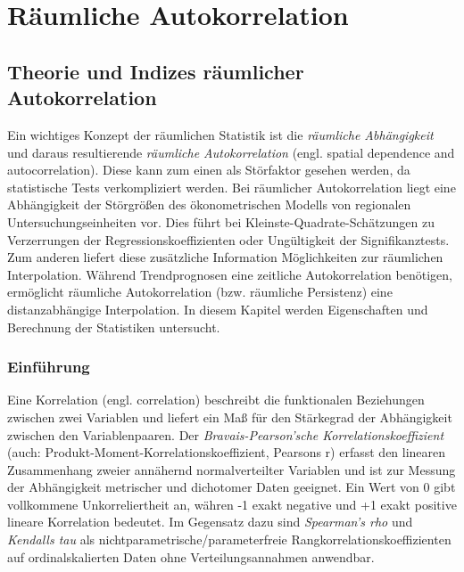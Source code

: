 \chapter{Räumliche Autokorrelation}
\label{ch:autocorrelation}
\section{Theorie und Indizes räumlicher Autokorrelation}

Ein wichtiges Konzept der räumlichen Statistik ist die \emph{räumliche Abhängigkeit} und daraus 
resultierende \emph{räumliche Autokorrelation} (engl. spatial dependence and autocorrelation).
Diese kann zum einen als Störfaktor gesehen werden, da statistische Tests verkompliziert werden. 
Bei räumlicher Autokorrelation liegt eine Abhängigkeit der Störgrößen des ökonometrischen Modells von regionalen 
Untersuchungseinheiten vor. Dies führt bei Kleinste-Quadrate-Schätzungen zu Verzerrungen der Regressionskoeffizienten 
oder Ungültigkeit der Signifikanztests. Zum anderen liefert diese zusätzliche Information Möglichkeiten 
zur räumlichen Interpolation. Während Trendprognosen eine zeitliche Autokorrelation benötigen, 
ermöglicht räumliche Autokorrelation (bzw. räumliche Persistenz) eine distanzabhängige Interpolation. 
In diesem Kapitel werden Eigenschaften und Berechnung der Statistiken untersucht.

\subsection{Einführung}

Eine Korrelation (engl. correlation) beschreibt die funktionalen Beziehungen zwischen zwei 
Variablen und liefert ein Maß für den Stärkegrad der Abhängigkeit zwischen den Variablenpaaren. 
Der \emph{Bravais-Pearson'sche Korrelationskoeffizient} (auch: Produkt-Moment-Korrelationskoeffizient, Pearsons r) 
erfasst den linearen Zusammenhang zweier annähernd normalverteilter Variablen und ist zur Messung der Abhängigkeit 
metrischer und dichotomer Daten geeignet. Ein Wert von 0 gibt vollkommene Unkorreliertheit an, währen -1 exakt 
negative und +1 exakt positive lineare Korrelation bedeutet. Im Gegensatz dazu sind \emph{Spearman's rho} und 
\emph{Kendalls tau} als nichtparametrische/parameterfreie Rangkorrelationskoeffizienten auf ordinalskalierten Daten 
ohne Verteilungsannahmen anwendbar.

